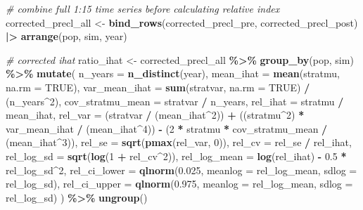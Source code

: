 \documentclass[
]{article}
\newenvironment{Shaded}{\begin{snugshade}}{\end{snugshade}}
\newcommand{\AttributeTok}[1]{\textcolor[rgb]{0.13,0.29,0.53}{#1}}
\newcommand{\CommentTok}[1]{\textcolor[rgb]{0.56,0.35,0.01}{\textit{#1}}}
\newcommand{\ConstantTok}[1]{\textcolor[rgb]{0.56,0.35,0.01}{#1}}
\newcommand{\DecValTok}[1]{\textcolor[rgb]{0.00,0.00,0.81}{#1}}
\newcommand{\FloatTok}[1]{\textcolor[rgb]{0.00,0.00,0.81}{#1}}
\newcommand{\FunctionTok}[1]{\textcolor[rgb]{0.13,0.29,0.53}{\textbf{#1}}}
\newcommand{\NormalTok}[1]{#1}
\newcommand{\OtherTok}[1]{\textcolor[rgb]{0.56,0.35,0.01}{#1}}
\newcommand{\SpecialCharTok}[1]{\textcolor[rgb]{0.81,0.36,0.00}{\textbf{#1}}}
\begin{document}
\begin{Shaded}
\begin{Highlighting}[]
\CommentTok{\# combine full 1:15 time series before calculating relative index}
\NormalTok{corrected\_precl\_all }\OtherTok{\textless{}{-}} \FunctionTok{bind\_rows}\NormalTok{(corrected\_precl\_pre, corrected\_precl\_post) }\SpecialCharTok{|\textgreater{}}
  \FunctionTok{arrange}\NormalTok{(pop, sim, year)}


\CommentTok{\# corrected ihat}
\NormalTok{ratio\_ihat }\OtherTok{\textless{}{-}}\NormalTok{ corrected\_precl\_all }\SpecialCharTok{\%\textgreater{}\%}
  \FunctionTok{group\_by}\NormalTok{(pop, sim) }\SpecialCharTok{\%\textgreater{}\%}
  \FunctionTok{mutate}\NormalTok{(}
    \AttributeTok{n\_years =} \FunctionTok{n\_distinct}\NormalTok{(year),}
    \AttributeTok{mean\_ihat =} \FunctionTok{mean}\NormalTok{(stratmu, }\AttributeTok{na.rm =} \ConstantTok{TRUE}\NormalTok{),}
    \AttributeTok{var\_mean\_ihat =} \FunctionTok{sum}\NormalTok{(stratvar, }\AttributeTok{na.rm =} \ConstantTok{TRUE}\NormalTok{) }\SpecialCharTok{/}\NormalTok{ (n\_years}\SpecialCharTok{\^{}}\DecValTok{2}\NormalTok{),}
    \AttributeTok{cov\_stratmu\_mean =}\NormalTok{ stratvar }\SpecialCharTok{/}\NormalTok{ n\_years,}
    \AttributeTok{rel\_ihat =}\NormalTok{ stratmu }\SpecialCharTok{/}\NormalTok{ mean\_ihat,}
    \AttributeTok{rel\_var =}
\NormalTok{      (stratvar }\SpecialCharTok{/}\NormalTok{ (mean\_ihat}\SpecialCharTok{\^{}}\DecValTok{2}\NormalTok{)) }\SpecialCharTok{+}
\NormalTok{      ((stratmu}\SpecialCharTok{\^{}}\DecValTok{2}\NormalTok{) }\SpecialCharTok{*}\NormalTok{ var\_mean\_ihat }\SpecialCharTok{/}\NormalTok{ (mean\_ihat}\SpecialCharTok{\^{}}\DecValTok{4}\NormalTok{)) }\SpecialCharTok{{-}}
\NormalTok{      (}\DecValTok{2} \SpecialCharTok{*}\NormalTok{ stratmu }\SpecialCharTok{*}\NormalTok{ cov\_stratmu\_mean }\SpecialCharTok{/}\NormalTok{ (mean\_ihat}\SpecialCharTok{\^{}}\DecValTok{3}\NormalTok{)),}
    \AttributeTok{rel\_se =} \FunctionTok{sqrt}\NormalTok{(}\FunctionTok{pmax}\NormalTok{(rel\_var, }\DecValTok{0}\NormalTok{)),}
    \AttributeTok{rel\_cv =}\NormalTok{ rel\_se }\SpecialCharTok{/}\NormalTok{ rel\_ihat,}
    \AttributeTok{rel\_log\_sd =} \FunctionTok{sqrt}\NormalTok{(}\FunctionTok{log}\NormalTok{(}\DecValTok{1} \SpecialCharTok{+}\NormalTok{ rel\_cv}\SpecialCharTok{\^{}}\DecValTok{2}\NormalTok{)),}
    \AttributeTok{rel\_log\_mean =} \FunctionTok{log}\NormalTok{(rel\_ihat) }\SpecialCharTok{{-}} \FloatTok{0.5} \SpecialCharTok{*}\NormalTok{ rel\_log\_sd}\SpecialCharTok{\^{}}\DecValTok{2}\NormalTok{,}
    \AttributeTok{rel\_ci\_lower =} \FunctionTok{qlnorm}\NormalTok{(}\FloatTok{0.025}\NormalTok{, }\AttributeTok{meanlog =}\NormalTok{ rel\_log\_mean, }\AttributeTok{sdlog =}\NormalTok{ rel\_log\_sd),}
    \AttributeTok{rel\_ci\_upper =} \FunctionTok{qlnorm}\NormalTok{(}\FloatTok{0.975}\NormalTok{, }\AttributeTok{meanlog =}\NormalTok{ rel\_log\_mean, }\AttributeTok{sdlog =}\NormalTok{ rel\_log\_sd)}
\NormalTok{  ) }\SpecialCharTok{\%\textgreater{}\%}
  \FunctionTok{ungroup}\NormalTok{()}



\end{Highlighting}
\end{Shaded}
\end{document}
